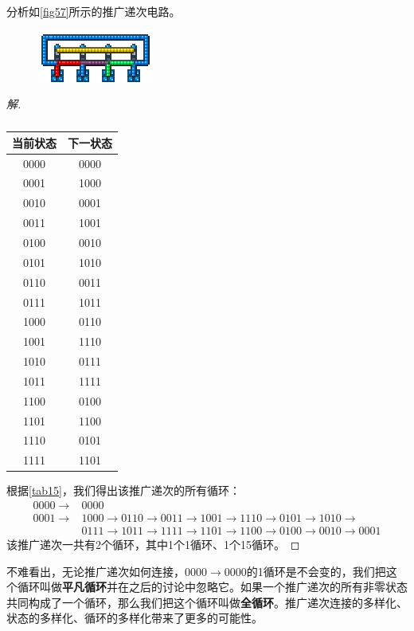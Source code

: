 \begin{example}{}{}
分析如\autoref{fig57}所示的推广递次电路。
\begin{figure}[H]
\centering
\includegraphics{images/426.png}
\caption{}\label{fig57}
\end{figure}
\end{example}
\begin{proof}[解]
\begin{table}[!ht]
\centering
\begin{tabular}{|c|c|}
\hline
当前状态&下一状态\\\hline
0000&0000\\\hline
0001&1000\\\hline
0010&0001\\\hline
0011&1001\\\hline
0100&0010\\\hline
0101&1010\\\hline
0110&0011\\\hline
0111&1011\\\hline
1000&0110\\\hline
1001&1110\\\hline
1010&0111\\\hline
1011&1111\\\hline
1100&0100\\\hline
1101&1100\\\hline
1110&0101\\\hline
1111&1101\\\hline
\end{tabular}
\caption{}\label{tab15}
\end{table}
根据\autoref{tab15}，我们得出该推广递次的所有循环：
\begin{align*}
0000\to &0000\\
0001\to &1000\to 0110\to 0011\to 1001\to 1110\to 0101\to 1010\to \\
        &0111\to 1011\to 1111\to 1101\to 1100\to 0100\to 0010\to 0001
\end{align*}
该推广递次一共有2个循环，其中1个1循环、1个15循环。
\end{proof}

不难看出，无论推广递次如何连接，$0000\to 0000$的1循环是不会变的，我们把这个循环叫做\textbf{平凡循环}并在之后的讨论中忽略它。如果一个推广递次的所有非零状态共同构成了一个循环，那么我们把这个循环叫做\textbf{全循环}。推广递次连接的多样化、状态的多样化、循环的多样化带来了更多的可能性。

